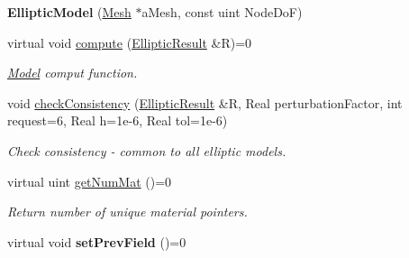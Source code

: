 \begin{DoxyCompactItemize}
\item 
\hypertarget{classvoom_1_1_elliptic_model_a9394b118c0ad908b352cee60b0b80406}{
{\bfseries EllipticModel} (\hyperlink{classvoom_1_1_mesh}{Mesh} $\ast$aMesh, const uint NodeDoF)}
\label{classvoom_1_1_elliptic_model_a9394b118c0ad908b352cee60b0b80406}

\item 
\hypertarget{classvoom_1_1_elliptic_model_a09a0d67b1e5afb4a9b3b77d6b8ab0b02}{
virtual void \hyperlink{classvoom_1_1_elliptic_model_a09a0d67b1e5afb4a9b3b77d6b8ab0b02}{compute} (\hyperlink{structvoom_1_1_elliptic_result}{EllipticResult} \&R)=0}
\label{classvoom_1_1_elliptic_model_a09a0d67b1e5afb4a9b3b77d6b8ab0b02}

\begin{DoxyCompactList}\small\item\em \hyperlink{classvoom_1_1_model}{Model} comput function. \item\end{DoxyCompactList}\item 
\hypertarget{classvoom_1_1_elliptic_model_aa4c8fd0705ad1432d832bf5d3e63be5d}{
void \hyperlink{classvoom_1_1_elliptic_model_aa4c8fd0705ad1432d832bf5d3e63be5d}{checkConsistency} (\hyperlink{structvoom_1_1_elliptic_result}{EllipticResult} \&R, Real perturbationFactor, int request=6, Real h=1e-\/6, Real tol=1e-\/6)}
\label{classvoom_1_1_elliptic_model_aa4c8fd0705ad1432d832bf5d3e63be5d}

\begin{DoxyCompactList}\small\item\em Check consistency -\/ common to all elliptic models. \item\end{DoxyCompactList}\item 
\hypertarget{classvoom_1_1_elliptic_model_a1139839466c453f15173cca6ff57cbed}{
virtual uint \hyperlink{classvoom_1_1_elliptic_model_a1139839466c453f15173cca6ff57cbed}{getNumMat} ()=0}
\label{classvoom_1_1_elliptic_model_a1139839466c453f15173cca6ff57cbed}

\begin{DoxyCompactList}\small\item\em Return number of unique material pointers. \item\end{DoxyCompactList}\item 
\hypertarget{classvoom_1_1_elliptic_model_ac6b72407edd6ab92e0537fc1c792c0af}{
virtual void {\bfseries setPrevField} ()=0}
\label{classvoom_1_1_elliptic_model_ac6b72407edd6ab92e0537fc1c792c0af}

\end{DoxyCompactItemize}


